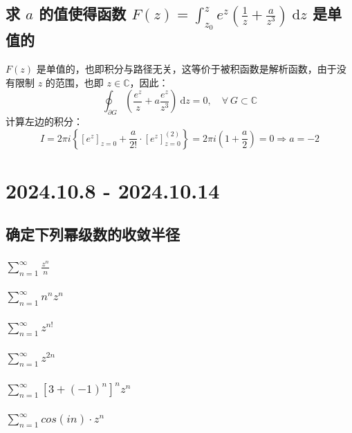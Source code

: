\documentclass[UTF8]{report}
\def\C{\mathbb{C}}
\theoremstyle{MyLineTheoremStyle} %
\theoremstyle{MyBlockTheoremStyle} %
\theoremstyle{MySubsubsectionStyle} %
\begin{document}
\section{求 $a$ 的值使得函数 $\displaystyle F(z) = \int_{z_0}^z e^z \left( \frac{1}{z} + \frac{a}{z^3}\right) \ \mathrm{d}z$ 是单值的}

$F(z)$ 是单值的，也即积分与路径无关，这等价于被积函数是解析函数，由于没有限制 $z$ 的范围，也即 $z \in \C$，因此：
\begin{equation}
\oint_{\partial G} \left( \frac{e^z}{z} + a\frac{e^z}{z^3} \right) \ \mathrm{d}z = 0,\quad \forall\ G \subset \C 
\end{equation}
计算左边的积分：
\begin{equation}
I =  2 \pi i \left\{ \left[e^z\right]_{z=0} + \frac{a}{2!}\cdot\left[e^z\right]^{(2)}_{z=0} \right\} = 2 \pi i \left( 1 + \frac{a}{2} \right) = 0 \Longrightarrow a = -2
\end{equation}

\chapter{2024.10.8 - 2024.10.14}\thispagestyle{fancy}

\section{确定下列幂级数的收敛半径}

\subsection{$\sum_{n=1}^{\infty} \frac{z^n}{n}$}
\subsection{$\sum_{n=1}^{\infty} n^n z^n$}
\subsection{$\sum_{n=1}^{\infty} z^{n!}$}
\subsection{$\sum_{n=1}^{\infty} z^{2n}$}
\subsection{$\sum_{n=1}^{\infty} \left[3 + (-1)^n\right]^n z^n$}
\subsection{$\sum_{n=1}^{\infty} cos(in) \cdot z^n$}
\end{document}
